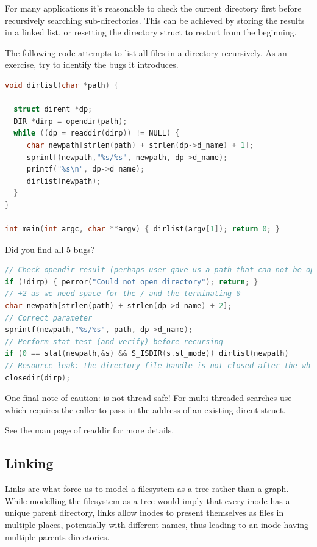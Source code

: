 For many applications it's reasonable to check the current directory first before recursively searching sub-directories. This can be achieved by storing the results in a linked list, or resetting the directory struct to restart from the beginning.

The following code attempts to list all files in a directory recursively. As an exercise, try to identify the bugs it introduces.

\begin{lstlisting}[language=C]
void dirlist(char *path) {

  struct dirent *dp;
  DIR *dirp = opendir(path);
  while ((dp = readdir(dirp)) != NULL) {
     char newpath[strlen(path) + strlen(dp->d_name) + 1];
     sprintf(newpath,"%s/%s", newpath, dp->d_name);
     printf("%s\n", dp->d_name);
     dirlist(newpath);
  }
}

int main(int argc, char **argv) { dirlist(argv[1]); return 0; }
\end{lstlisting}

Did you find all 5 bugs?

\begin{lstlisting}[language=C]
// Check opendir result (perhaps user gave us a path that can not be opened as a directory
if (!dirp) { perror("Could not open directory"); return; }
// +2 as we need space for the / and the terminating 0
char newpath[strlen(path) + strlen(dp->d_name) + 2];
// Correct parameter
sprintf(newpath,"%s/%s", path, dp->d_name);
// Perform stat test (and verify) before recursing
if (0 == stat(newpath,&s) && S_ISDIR(s.st_mode)) dirlist(newpath)
// Resource leak: the directory file handle is not closed after the while loop
closedir(dirp);
\end{lstlisting}

One final note of caution:  is not thread-safe! For multi-threaded searches use  which requires the caller to pass in the address of an existing dirent struct.

See the man page of readdir for more details.

\subsection{Linking}

Links are what force us to model a filesystem as a tree rather than a graph. While modelling the filesystem as a tree would imply that every inode has a unique parent directory, links allow inodes to present themselves as files in multiple places, potentially with different names, thus leading to an inode having multiple parents directories.

